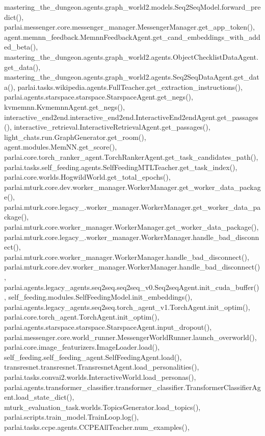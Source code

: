 mastering\+\_\+the\+\_\+dungeon.\+agents.\+graph\+\_\+world2.\+models.\+Seq2\+Seq\+Model.\+forward\+\_\+predict(), parlai.\+messenger.\+core.\+messenger\+\_\+manager.\+Messenger\+Manager.\+get\+\_\+app\+\_\+token(), agent.\+memnn\+\_\+feedback.\+Memnn\+Feedback\+Agent.\+get\+\_\+cand\+\_\+embeddings\+\_\+with\+\_\+added\+\_\+beta(), mastering\+\_\+the\+\_\+dungeon.\+agents.\+graph\+\_\+world2.\+agents.\+Object\+Checklist\+Data\+Agent.\+get\+\_\+data(), mastering\+\_\+the\+\_\+dungeon.\+agents.\+graph\+\_\+world2.\+agents.\+Seq2\+Seq\+Data\+Agent.\+get\+\_\+data(), parlai.\+tasks.\+wikipedia.\+agents.\+Full\+Teacher.\+get\+\_\+extraction\+\_\+instructions(), parlai.\+agents.\+starspace.\+starspace.\+Starspace\+Agent.\+get\+\_\+negs(), kvmemnn.\+Kvmemnn\+Agent.\+get\+\_\+negs(), interactive\+\_\+end2end.\+interactive\+\_\+end2end.\+Interactive\+End2end\+Agent.\+get\+\_\+passages(), interactive\+\_\+retrieval.\+Interactive\+Retrieval\+Agent.\+get\+\_\+passages(), light\+\_\+chats.\+run.\+Graph\+Generator.\+get\+\_\+room(), agent.\+modules.\+Mem\+N\+N.\+get\+\_\+score(), parlai.\+core.\+torch\+\_\+ranker\+\_\+agent.\+Torch\+Ranker\+Agent.\+get\+\_\+task\+\_\+candidates\+\_\+path(), parlai.\+tasks.\+self\+\_\+feeding.\+agents.\+Self\+Feeding\+M\+T\+L\+Teacher.\+get\+\_\+task\+\_\+index(), parlai.\+core.\+worlds.\+Hogwild\+World.\+get\+\_\+total\+\_\+epochs(), parlai.\+mturk.\+core.\+dev.\+worker\+\_\+manager.\+Worker\+Manager.\+get\+\_\+worker\+\_\+data\+\_\+package(), parlai.\+mturk.\+core.\+legacy\+\_.\+worker\+\_\+manager.\+Worker\+Manager.\+get\+\_\+worker\+\_\+data\+\_\+package(), parlai.\+mturk.\+core.\+worker\+\_\+manager.\+Worker\+Manager.\+get\+\_\+worker\+\_\+data\+\_\+package(), parlai.\+mturk.\+core.\+legacy\+\_.\+worker\+\_\+manager.\+Worker\+Manager.\+handle\+\_\+bad\+\_\+disconnect(), parlai.\+mturk.\+core.\+worker\+\_\+manager.\+Worker\+Manager.\+handle\+\_\+bad\+\_\+disconnect(), parlai.\+mturk.\+core.\+dev.\+worker\+\_\+manager.\+Worker\+Manager.\+handle\+\_\+bad\+\_\+disconnect(), parlai.\+agents.\+legacy\+\_\+agents.\+seq2seq.\+seq2seq\+\_\+v0.\+Seq2seq\+Agent.\+init\+\_\+cuda\+\_\+buffer(), self\+\_\+feeding.\+modules.\+Self\+Feeding\+Model.\+init\+\_\+embeddings(), parlai.\+agents.\+legacy\+\_\+agents.\+seq2seq.\+torch\+\_\+agent\+\_\+v1.\+Torch\+Agent.\+init\+\_\+optim(), parlai.\+core.\+torch\+\_\+agent.\+Torch\+Agent.\+init\+\_\+optim(), parlai.\+agents.\+starspace.\+starspace.\+Starspace\+Agent.\+input\+\_\+dropout(), parlai.\+messenger.\+core.\+world\+\_\+runner.\+Messenger\+World\+Runner.\+launch\+\_\+overworld(), parlai.\+core.\+image\+\_\+featurizers.\+Image\+Loader.\+load(), self\+\_\+feeding.\+self\+\_\+feeding\+\_\+agent.\+Self\+Feeding\+Agent.\+load(), transresnet.\+transresnet.\+Transresnet\+Agent.\+load\+\_\+personalities(), parlai.\+tasks.\+convai2.\+worlds.\+Interactive\+World.\+load\+\_\+personas(), parlai.\+agents.\+transformer\+\_\+classifier.\+transformer\+\_\+classifier.\+Transformer\+Classifier\+Agent.\+load\+\_\+state\+\_\+dict(), mturk\+\_\+evaluation\+\_\+task.\+worlds.\+Topics\+Generator.\+load\+\_\+topics(), parlai.\+scripts.\+train\+\_\+model.\+Train\+Loop.\+log(), parlai.\+tasks.\+ccpe.\+agents.\+C\+C\+P\+E\+All\+Teacher.\+num\+\_\+examples(), 
